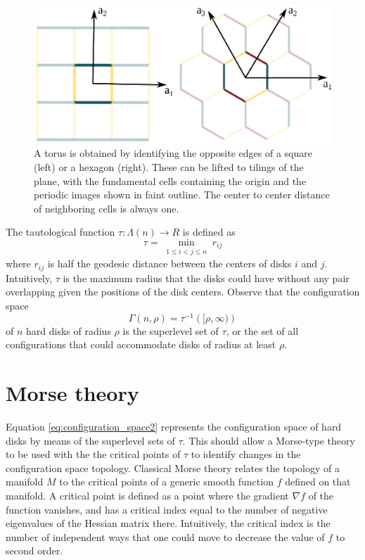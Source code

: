 \documentclass[default,iicol]{sn-jnl}%
\theoremstyle{thmstyleone}%
\theoremstyle{thmstyletwo}%
\theoremstyle{thmstylethree}%
\begin{document}
\begin{figure}
	\centering
	\includegraphics[width=0.9\columnwidth]{figure2.eps}
	\caption{A torus is obtained by identifying the opposite edges of a square (left) or a hexagon (right). These can be lifted to tilings of the plane, with the fundamental cells containing the origin and the periodic images shown in faint outline. The center to center distance of neighboring cells is always one.}
	\label{fig:figure2}
\end{figure}

The tautological function $\tau: \Lambda(n) \rightarrow R$ is defined as
\begin{equation*}
\tau = \min\limits_{\substack{1 \leq i < j \leq n}} {r_{ij}}
\label{eq:tautological_function}
\end{equation*}
where $r_{ij}$ is half the geodesic distance between the centers of disks $i$ and $j$. Intuitively, $\tau$ is the maximum radius that the disks could have without any pair overlapping given the positions of the disk centers. Observe that the configuration space
\begin{equation}
\Gamma(n,\rho) = \tau^{-1}\left([\rho,\infty)\right)
\label{eq:configuration_space2}
\end{equation}
of $n$ hard disks of radius $\rho$ is the superlevel set of $\tau$, or the set of all configurations that could accommodate disks of radius at least $\rho$.

\section{Morse theory}
\label{sec:morse_theory}

Equation \ref{eq:configuration_space2} represents the configuration space of hard disks by means of the superlevel sets of $\tau$. This should allow a Morse-type theory to be used with the the critical points of $\tau$ to identify changes in the configuration space topology. Classical Morse theory \cite{morse1934,milnor2016morse} relates the topology of a manifold $M$ to the critical points of a generic smooth function $f$ defined on that manifold. A critical point is defined as a point where the gradient $\nabla f$ of the function vanishes, and has a critical index equal to the number of negative eigenvalues of the Hessian matrix there. Intuitively, the critical index is the number of independent ways that one could move to decrease the value of $f$ to second order.
\end{document}
